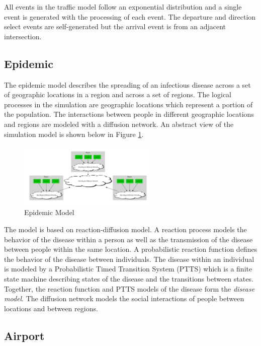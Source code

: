 \documentclass[11pt]{book}
\begin{document}
All events in the traffic model follow an exponential distribution and a single event
is generated with the processing of each event.  The departure and direction select events
are self-generated but the arrival event is from an adjacent intersection.

\subsection{Epidemic}

The epidemic model describes the spreading of an infectious disease across a set of
geographic locations in a region and across a set of regions.  The logical processes in
the simulation are geographic locations which represent a portion of the population.  The
interactions between people in different geographic locations and regions are modeled with
a diffusion network.  An abstract view of the simulation model is shown below in Figure
\ref{epidemic_model}.

\begin{figure}
    \centering
    \includegraphics[width=0.6\textwidth,quiet]{figs/graphviz/epidemic.pdf}
    \caption{Epidemic Model}\label{epidemic_model}
\end{figure}

The model is based on reaction-diffusion model\cite{perumalla-12}.  A reaction process
models the behavior of the disease within a person as well as the transmission of the
disease between people within the same location.  A probabilistic reaction function defines
the behavior of the disease between individuals\cite{barrett-08}.  The disease within an
individual is modeled by a Probabilistic Timed Transition System (PTTS)\cite{barrett-08}
which is a finite state machine describing states of the disease and the transitions between states.
Together, the reaction function and PTTS models of the disease form the \emph{disease model}.
The diffusion network models the social interactions of people between locations and between
regions\cite{barrett-08}.

\subsection{Airport}
\end{document}
